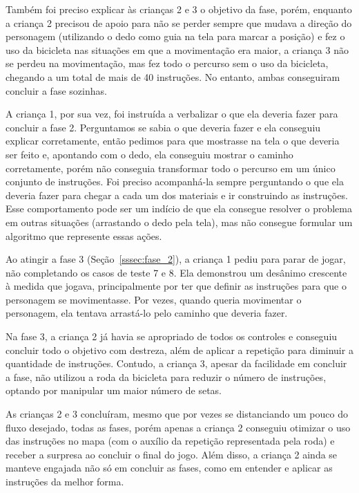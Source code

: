 Também foi preciso explicar às crianças 2 e 3 o objetivo da fase, porém, enquanto a criança 2 precisou de apoio para não se perder sempre que mudava a direção do personagem (utilizando o dedo como guia na tela para marcar a posição) e fez o uso da bicicleta nas situações em que a movimentação era maior, a criança 3 não se perdeu na movimentação, mas fez todo o percurso sem o uso da bicicleta, chegando a um total de mais de 40 instruções. No entanto, ambas conseguiram concluir a fase sozinhas.

A criança 1, por sua vez, foi instruída a verbalizar o que ela deveria fazer para concluir a fase 2. Perguntamos se sabia o que deveria fazer e ela conseguiu explicar corretamente, então pedimos para que mostrasse na tela o que deveria ser feito e, apontando com o dedo, ela conseguiu mostrar o caminho corretamente, porém não conseguia transformar todo o percurso em um único conjunto de instruções. Foi preciso acompanhá-la sempre perguntando o que ela deveria fazer para chegar a cada um dos materiais e ir construindo as instruções. Esse comportamento pode ser um indício de que ela consegue resolver o problema em outras situações (arrastando o dedo pela tela), mas não consegue formular um algoritmo que represente essas ações.

Ao atingir a fase 3 (Seção~\ref{sssec:fase_2}), a criança 1 pediu para parar de jogar, não completando os casos de teste 7 e 8. Ela demonstrou um desânimo crescente à medida que jogava, principalmente por ter que definir as instruções para que o personagem se movimentasse. Por vezes, quando queria movimentar o personagem, ela tentava arrastá-lo pelo caminho que deveria fazer.

Na fase 3, a criança 2 já havia se apropriado de todos os controles e conseguiu concluir todo o objetivo com destreza, além de aplicar a repetição para diminuir a quantidade de instruções. Contudo, a criança 3, apesar da facilidade em concluir a fase, não utilizou a roda da bicicleta para reduzir o número de instruções, optando por manipular um maior número de setas.

As crianças 2 e 3 concluíram, mesmo que por vezes se distanciando um pouco do fluxo desejado, todas as fases, porém apenas a criança 2 conseguiu otimizar o uso das instruções no mapa (com o auxílio da repetição representada pela roda) e receber a surpresa ao concluir o final do jogo. Além disso, a criança 2 ainda se manteve engajada não só em concluir as fases, como em entender e aplicar as instruções da melhor forma.

